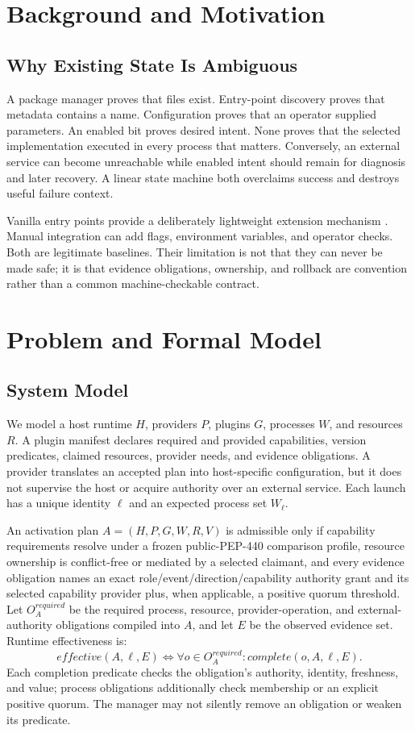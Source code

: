 \documentclass[letterpaper,twocolumn,10pt]{article}
\begin{document}
\section{Background and Motivation}
\subsection{Why Existing State Is Ambiguous}
A package manager proves that files exist.  Entry-point discovery proves that
metadata contains a name.  Configuration proves that an operator supplied
parameters.  An enabled bit proves desired intent.  None proves that the
selected implementation executed in every process that matters.  Conversely,
an external service can become unreachable while enabled intent should remain
for diagnosis and later recovery.  A linear state machine both overclaims
success and destroys useful failure context.

Vanilla entry points provide a deliberately lightweight extension mechanism
\cite{vllm-plugin}.  Manual integration can add flags, environment variables,
and operator checks.  Both are legitimate baselines.  Their limitation is not
that they can never be made safe; it is that evidence obligations, ownership,
and rollback are convention rather than a common machine-checkable contract.

\section{Problem and Formal Model}
\subsection{System Model}
We model a host runtime $H$, providers $P$, plugins $G$, processes $W$, and
resources $R$.  A plugin manifest declares required and provided capabilities,
version predicates, claimed resources, provider needs, and evidence
obligations.  A provider translates an accepted plan into host-specific
configuration, but it does not supervise the host or acquire authority over an
external service.  Each launch has a unique identity $\ell$ and an expected
process set $W_\ell$.

An activation plan $A=(H,P,G,W,R,V)$ is admissible only if capability
requirements resolve under a frozen public-PEP-440 comparison profile,
resource ownership is conflict-free or mediated by a selected claimant, and
every evidence obligation names an exact role/event/direction/capability
authority grant and its selected capability provider plus, when applicable, a
positive quorum threshold.  Let $O_A^{required}$ be the required process,
resource, provider-operation, and external-authority obligations compiled into
$A$, and let $E$ be the observed evidence set.  Runtime effectiveness is:
\begin{equation*}
effective(A,\ell,E) \iff
\forall o \in O_A^{required}: complete(o,A,\ell,E).
\end{equation*}
Each completion predicate checks the obligation's authority, identity,
freshness, and value; process obligations additionally check membership or an
explicit positive quorum.  The manager may not silently remove an obligation
or weaken its predicate.
\end{document}
